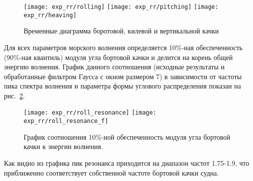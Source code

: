 \begin{figure}[ht]
	\begin{center}
	\texttt{[image: exp\_rr/rolling]}
	\texttt{[image: exp\_rr/pitching]}
	\texttt{[image: exp\_rr/heaving]}
	\end{center}
	\caption{Временные диаграмма боротовой, килевой и вертикальной качки}
	\label{exp_rr_rolling}
\end{figure}

Для всех параметров морского волнения определяется 10\%-ная обеспеченность (90\%-ная квантиль) модуля угла бортовой качки и делится на корень общей энергию волнения. График данного соотношения (исходные результаты и обработанные фильтром Гаусса с окном размером 7) в зависимости от частоты пика спектра волнения и параметра формы углового распределения показан на рис.~\ref{rr_res}.

\begin{figure}[ht]
	\begin{center}
	\texttt{[image: exp\_rr/roll\_resonance]}
	\texttt{[image: exp\_rr/roll\_resonance\_f]}
	\end{center}
	\caption{График соотношения 10\%-ной обеспеченность модуля угла бортовой качки к энергии волнения.}
	\label{rr_res}
\end{figure}

Как видно из графика пик резонанса приходится на диапазон частот 1.75-1.9, что приближенно соответствует собственной частоте бортовой качки судна.